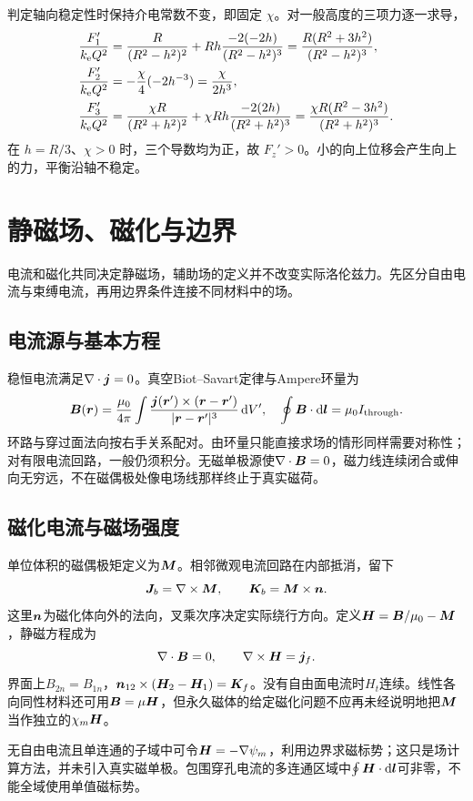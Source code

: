 \begin{solution}
判定轴向稳定性时保持介电常数不变，即固定 $\chi$。对一般高度的三项力逐一求导，
\[\begin{aligned}
\frac{F_1'}{k_{\rm e} Q^2}
&=\frac{R}{(R^2-h^2)^2}
+Rh\frac{-2(-2h)}{(R^2-h^2)^3}
=\frac{R(R^2+3h^2)}{(R^2-h^2)^3},\\
\frac{F_2'}{k_{\rm e} Q^2}
&=-\frac\chi4(-2h^{-3})=\frac{\chi}{2h^3},\\
\frac{F_3'}{k_{\rm e} Q^2}
&=\frac{\chi R}{(R^2+h^2)^2}
+\chi Rh\frac{-2(2h)}{(R^2+h^2)^3}
=\frac{\chi R(R^2-3h^2)}{(R^2+h^2)^3}.
\end{aligned}
\]
在 $h=R/3$、$\chi>0$ 时，三个导数均为正，故 $F_z'>0$。小的向上位移会产生向上的力，平衡沿轴不稳定。
\end{solution}

\section{静磁场、磁化与边界}\label{sec:es4-magnetism}
电流和磁化共同决定静磁场，辅助场的定义并不改变实际洛伦兹力。先区分自由电流与束缚电流，再用边界条件连接不同材料中的场。

\subsection{电流源与基本方程}
稳恒电流满足$\nabla\cdot\bm{j}=0$。真空Biot--Savart定律与Ampere环量为
\[\bm{B}(\bm{r})=\frac{\mu_0}{4\pi}\int\frac{\bm{j}(\bm{r}')\times(\bm{r}-\bm{r}')}{|\bm{r}-\bm{r}'|^3}\mathop{}\!\mathrm d V',\quad
\oint\bm{B}\cdot\mathop{}\!\mathrm d\bm{l}=\mu_0I_{\rm through}.
\]
环路与穿过面法向按右手关系配对。由环量只能直接求场的情形同样需要对称性；对有限电流回路，一般仍须积分。无磁单极源使$\nabla\cdot\bm{B}=0$，磁力线连续闭合或伸向无穷远，不在磁偶极处像电场线那样终止于真实磁荷。

\subsection{磁化电流与磁场强度}
单位体积的磁偶极矩定义为$\bm{M}$。相邻微观电流回路在内部抵消，留下
\[\bm{J}_b=\nabla\times\bm{M},\qquad \bm{K}_b=\bm{M}\times\bm{n}.
\]
这里$\bm{n}$为磁化体向外的法向，叉乘次序决定实际绕行方向。定义$\bm{H}=\bm{B}/\mu_0-\bm{M}$，静磁方程成为
\[\nabla\cdot\bm{B}=0,\qquad\nabla\times\bm{H}=\bm{j}_f.
\]
界面上$B_{2n}=B_{1n}$，$\bm{n}_{12}\times(\bm{H}_2-\bm{H}_1)=\bm{K}_f$。没有自由面电流时$H_t$连续。线性各向同性材料还可用$\bm{B}=\mu\bm{H}$，但永久磁体的给定磁化问题不应再未经说明地把$\bm{M}$当作独立的$\chi_m\bm{H}$。

无自由电流且单连通的子域中可令$\bm{H}=-\nabla\psi_m$，利用边界求磁标势；这只是场计算方法，并未引入真实磁单极。包围穿孔电流的多连通区域中$\oint\bm{H}\cdot\mathop{}\!\mathrm d\bm{l}$可非零，不能全域使用单值磁标势。


